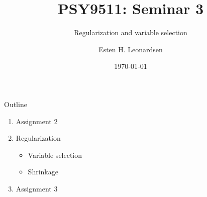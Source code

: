 \documentclass{beamer}
\title{PSY9511: Seminar 3}
\subtitle{Regularization and variable selection}
\author{Esten H. Leonardsen}
\date{\today}
\begin{document}
	\begin{frame}
	 	\maketitle
	\end{frame}

    \begin{frame}{Outline}
        \centering
        \vfill
        \begin{enumerate}
            \item Assignment 2
            \item Regularization
            \begin{itemize}
                \item Variable selection
                \item Shrinkage
            \end{itemize}
            \item Assignment 3
        \end{enumerate}
        \vfill
    \end{frame}

    
    
    
\end{document}
